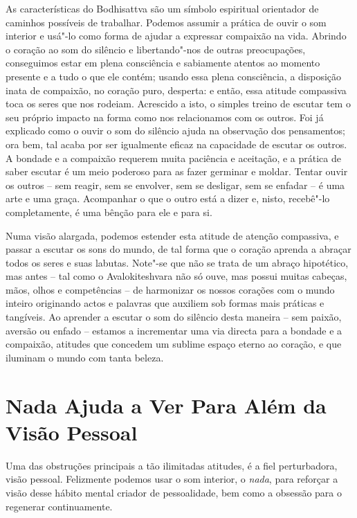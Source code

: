 As características do Bodhisattva são um símbolo espiritual orientador
de caminhos possíveis de trabalhar. Podemos assumir a prática de ouvir o
som interior e usá"-lo como forma de ajudar a expressar compaixão na
vida. Abrindo o coração ao som do silêncio e libertando"-nos de outras
preocupações, conseguimos estar em plena consciência e sabiamente
atentos ao momento presente e a tudo o que ele contém; usando essa plena
consciência, a disposição inata de compaixão, no coração puro, desperta:
e então, essa atitude compassiva toca os seres que nos rodeiam.
Acrescido a isto, o simples treino de escutar tem o seu próprio impacto
na forma como nos relacionamos com os outros. Foi já explicado como o
ouvir o som do silêncio ajuda na observação dos pensamentos; ora bem,
tal acaba por ser igualmente eficaz na capacidade de escutar os outros.
A bondade e a compaixão requerem muita paciência e aceitação, e a
prática de saber escutar é um meio poderoso para as fazer germinar e
moldar. Tentar ouvir os outros -- sem reagir, sem se envolver, sem se
desligar, sem se enfadar -- é uma arte e uma graça. Acompanhar o que o
outro está a dizer e, nisto, recebê"-lo completamente, é uma bênção para
ele e para si.

Numa visão alargada, podemos estender esta atitude de atenção
compassiva, e passar a escutar os sons do mundo, de tal forma que o
coração aprenda a abraçar todos os seres e suas labutas. Note"-se que não
se trata de um abraço hipotético, mas antes -- tal como o
Avalokiteshvara não só ouve, mas possui muitas cabeças, mãos, olhos e
competências -- de harmonizar os nossos corações com o mundo inteiro
originando actos e palavras que auxiliem sob formas mais práticas e
tangíveis. Ao aprender a escutar o som do silêncio desta maneira -- sem
paixão, aversão ou enfado -- estamos a incrementar uma via directa para
a bondade e a compaixão, atitudes que concedem um sublime espaço eterno
ao coração, e que iluminam o mundo com tanta beleza.

\section{Nada Ajuda a Ver Para Além da Visão Pessoal}

Uma das obstruções principais a tão ilimitadas atitudes, é a fiel
perturbadora, visão pessoal. Felizmente podemos usar o som interior, o
\emph{nada}, para reforçar a visão desse hábito mental criador de
pessoalidade, bem como a obsessão para o regenerar continuamente.

